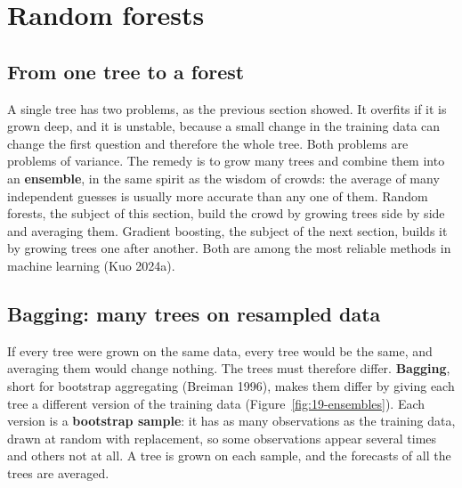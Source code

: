 \section{Random forests}
\label{sec:19-rf}

\subsection{From one tree to a forest}

A single tree has two problems, as the previous section showed. It overfits if it is grown deep, and it is unstable, because a small change in the training data can change the first question and therefore the whole tree. Both problems are problems of variance. The remedy is to grow many trees and combine them into an \textbf{ensemble}, in the same spirit as the wisdom of crowds: the average of many independent guesses is usually more accurate than any one of them. Random forests, the subject of this section, build the crowd by growing trees side by side and averaging them. Gradient boosting, the subject of the next section, builds it by growing trees one after another. Both are among the most reliable methods in machine learning (Kuo 2024a).

\subsection{Bagging: many trees on resampled data}

If every tree were grown on the same data, every tree would be the same, and averaging them would change nothing. The trees must therefore differ. \textbf{Bagging}, short for bootstrap aggregating (Breiman 1996), makes them differ by giving each tree a different version of the training data (Figure~\ref{fig:19-ensembles}). Each version is a \textbf{bootstrap sample}: it has as many observations as the training data, drawn at random with replacement, so some observations appear several times and others not at all. A tree is grown on each sample, and the forecasts of all the trees are averaged.

